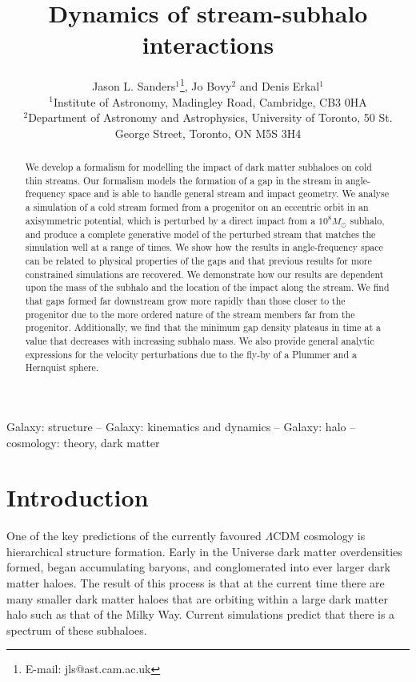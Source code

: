 \documentclass[useAMS,usenatbib,fleqn,a4paper]{mn2e}
\title{Dynamics of stream-subhalo interactions}
\author[J. L. Sanders, J. Bovy and D. Erkal]{Jason L. Sanders$^1$\thanks{E-mail: jls@ast.cam.ac.uk}, Jo Bovy$^2$ and Denis Erkal$^1$\\
$^1$Institute of Astronomy, Madingley Road, Cambridge, CB3 0HA\\
$^2$Department of Astronomy and Astrophysics, University of Toronto, 50 St. George Street, Toronto, ON M5S 3H4}
\begin{document}
\maketitle
\label{firstpage}
\begin{abstract}
We develop a formalism for modelling the impact of dark matter subhaloes on cold thin streams. Our formalism models the formation of a gap in the stream in angle-frequency space and is able to handle general stream and impact geometry. We analyse a simulation of a cold stream formed from a progenitor on an eccentric orbit in an axisymmetric potential, which is perturbed by a direct impact from a $10^8 M_\odot$ subhalo, and produce a complete generative model of the perturbed stream that matches the simulation well at a range of times. We show how the results in angle-frequency space can be related to physical properties of the gaps and that previous results for more constrained simulations are recovered. We demonstrate how our results are dependent upon the mass of the subhalo and the location of the impact along the stream. We find that gaps formed far downstream grow more rapidly than those closer to the progenitor due to the more ordered nature of the stream members far from the progenitor. Additionally, we find that the minimum gap density plateaus in time at a value that decreases with increasing subhalo mass. We also provide general analytic expressions for the velocity perturbations due to the fly-by of a Plummer and a Hernquist sphere.
\end{abstract}

\begin{keywords}
Galaxy: structure -- Galaxy: kinematics and dynamics -- Galaxy: halo -- cosmology: theory, dark matter
\end{keywords}

\section{Introduction}

One of the key predictions of the currently favoured $\Lambda$CDM cosmology is hierarchical structure formation. Early in the Universe dark matter overdensities formed, began accumulating baryons, and conglomerated into ever larger dark matter haloes. The result of this process is that at the current time there are many smaller dark matter haloes that are orbiting within a large dark matter halo such as that of the Milky Way. Current simulations \citep{Diemand2008,Springel2008} predict that there is a spectrum of these subhaloes.
\end{document}
